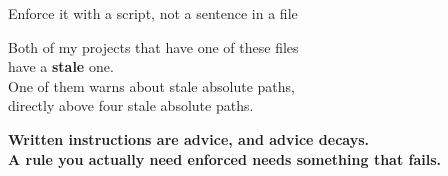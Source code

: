 \begin{frame}{Enforce it with a script, not a sentence in a file}
  \vfill
  \begin{center}
    {\large Both of my projects that have one of these files\\
     have a \textbf{stale} one.}\\[1.4em]
    {One of them warns about stale absolute paths,\\
     directly above four stale absolute paths.}
  \end{center}
  \vfill
  \begin{center}
    {\large\color{NDBlue}\textbf{Written instructions are advice, and advice decays.\\
     A rule you actually need enforced needs something that fails.}}
  \end{center}
  \vfill
\end{frame}
